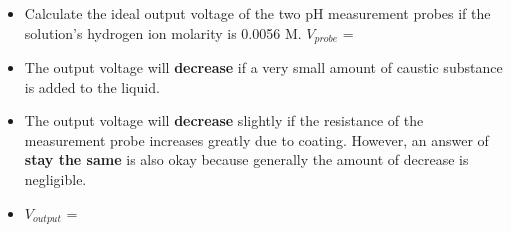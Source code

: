 





\begin{itemize}
\item{} Calculate the ideal output voltage of the two pH measurement probes if the solution's hydrogen ion molarity is 0.0056 M.  $V_{probe}$ = 
\vskip 5pt
\item{} The output voltage will {\bf decrease} if a very small amount of caustic substance is added to the liquid.
\vskip 5pt
\item{} The output voltage will {\bf decrease} slightly if the resistance of the measurement probe increases greatly due to coating.  However, an answer of {\bf stay the same} is also okay because generally the amount of decrease is negligible.
\vskip 5pt
\item{} $V_{output}$ = 
\end{itemize}











